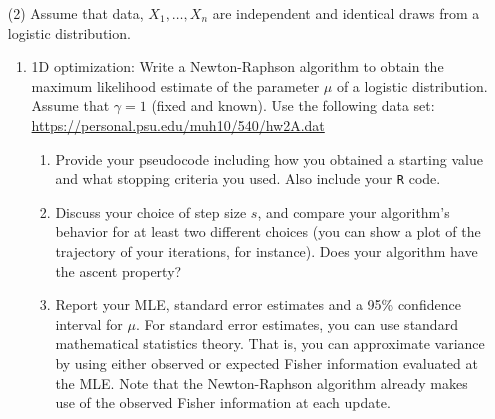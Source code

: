 \documentclass[10pt]{article}
\begin{document}
\begin{enumerate}
\item[(2)] Assume that data, $X_1,\dots,X_n$ are independent and
  identical draws from a logistic distribution.
\begin{enumerate}
\item 1D optimization: Write a Newton-Raphson algorithm to obtain the maximum
  likelihood estimate of the parameter $\mu$ of a logistic
  distribution. Assume that $\gamma=1$ (fixed and known). Use the
  following data set: \url{https://personal.psu.edu/muh10/540/hw2A.dat}
\begin{enumerate}
\item Provide your pseudocode including how you obtained a starting
  value and what stopping criteria you used. Also include your {\tt R} code.
\item Discuss your choice of step size $s$, and compare your 
  algorithm's behavior for at least two different choices (you can 
  show a plot of the trajectory of your iterations, for 
  instance). Does your algorithm have the ascent property? %
\item Report your MLE, standard error estimates and a 95\% confidence
  interval for $\mu$. For standard error estimates, you can use standard mathematical
  statistics theory. That is, you can approximate variance by using either observed or expected Fisher
  information evaluated at the MLE. Note that the Newton-Raphson
  algorithm already makes use of the observed Fisher information at
  each update.
\end{enumerate}

\end{enumerate}
\end{enumerate}
\end{document}
